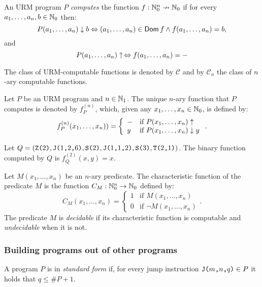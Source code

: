 
\begin{definition}
	An URM program $P$ \emph{computes} the function $f : \mathbb{N}_0^n \nrightarrow \mathbb{N}_0$ if for every $a_1, \ldots, a_n, b \in \mathbb{N}_0$ then:
	\begin{equation*}
		P(a_1, \ldots, a_n) \downarrow b \Leftrightarrow (a_1, \ldots, a_n) \in \operatorname{\mathsf{Dom}} f \land f(a_1, \ldots, a_n) = b,	
	\end{equation*}
	and
	\begin{equation*}
		P(a_1, \ldots, a_n) \uparrow \, \Leftrightarrow f(a_1, \ldots, a_n) = \--	
	\end{equation*}
\end{definition}
The class of URM-computable functions is denoted by $\mathcal{C}$ and by $\mathcal{C}_n$ the class of $n$-ary computable functions. 

\begin{definition}
	Let $P$ be an URM program and $n \in \mathbb{N}_1$. The unique $n$-ary function that $P$ computes is denoted by $f_P^{(n)}$, which, given any $x_1, \ldots, x_n \in \mathbb{N}_0$, is defined by:
	\[
		f_P^{(n)}(x_1, \ldots, x_n) ) = 
		\left\{
	\begin{array}{ll}
		\-- & \mbox{if } P(x_1, \ldots, x_n) \uparrow \\
		y & \mbox{if } P(x_1, \ldots, x_n) \downarrow y 
	\end{array}
	\right. .
	\]
\end{definition}
\begin{example}
	Let $Q = (\texttt{Z(} 2 \texttt{)}, \texttt{J(} 1\texttt{,} 2 \texttt{,} 6 \texttt{)}, \texttt{S(} 2 \texttt{)}, \texttt{J(} 1\texttt{,} 1 \texttt{,} 2 \texttt{)}, \texttt{S(} 3 \texttt{)}, \texttt{T(} 2 \texttt{,} 1 \texttt{)})$. The binary function computed by $Q$ is $f_Q^{(2)}(x,y) = x$.
\end{example}
\begin{definition}
Let $M(x_1, \ldots, x_n)$ be an $n$-ary predicate. The characteristic function of the predicate $M$ is the function $C_M : \mathbb{N}_0^n \to \mathbb{N}_0$ defined by:
\[
	C_M(x_1, \ldots, x_n) = 
		\left\{
	\begin{array}{ll}
		1 & \mbox{if } M(x_1, \ldots, x_n) \\
		0 & \mbox{if } \neg M(x_1, \ldots, x_n) 
	\end{array}
	\right. .
\]
The predicate $M$ is \emph{decidable} if its characteristic function is computable and \emph{undecidable} when it is not.
\end{definition}

\subsubsection*{Building programs out of other programs}
\begin{definition}
	A program $P$ is in \emph{standard form} if, for every jump instruction $\texttt{J(} m\texttt{,} n \texttt{,} q \texttt{)} \in P$ it holds that $q \leq \#P + 1$.
\end{definition}

